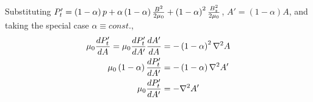 Substituting $P_t'=\left( 1-\alpha \right)p + \alpha\left( 1-\alpha \right)\frac{B^2}{2\mu_0} + \left( 1-\alpha \right)^2\frac{B_z^2}{2\mu_0}$, $A'=(1-\alpha)A$, and taking the special case $\alpha\equiv const.$,
\[
\begin{split}
    \mu_0\frac{dP_t'}{dA} = \mu_0\frac{dP_t'}{dA'}\frac{dA'}{dA} &= -\left( 1-\alpha \right)^2\nabla^2 A \\
    \mu_0\left( 1-\alpha \right)\frac{dP_t'}{dA'} &= -\left( 1-\alpha \right)\nabla^2 A' \\
    \mu_0\frac{dP_t'}{dA'} &= -\nabla^2 A' \\
\end{split}
\]




